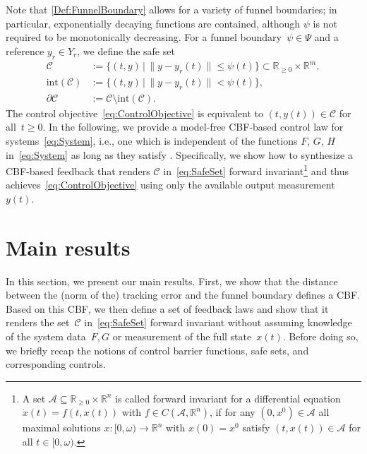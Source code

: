 \documentclass[journal,twoside,web]{ieeeconf}
\newcommand{\R}{\mathbb{R}}
\begin{document}
Note that \eqref{Def:FunnelBoundary} allows for a variety of funnel boundaries; in particular, exponentially decaying functions are contained, although $\psi$ is not required to be monotonically decreasing.
For a funnel boundary~$\psi \in \Psi$ and a reference $y_r \in Y_r$, we define the safe set
\begin{equation} \label{eq:SafeSet}
    \begin{aligned}
        \mathcal{C} &:= \{ (t,y) \, | \,  \| y - y_r(t) \| \le \psi(t)  \} \subset \R_{\ge 0} \times \R^m, \\
        \mathrm{int} (\mathcal{C}) &:= \{ (t,y) \, | \, \| y - y_r(t) \| < \psi(t) \}, \\
        \partial\mathcal{C} &:= \mathcal{C} \setminus \mathrm{int} (\mathcal{C}).
    \end{aligned}
\end{equation}
The control objective~\eqref{eq:ControlObjective} is equivalent to $(t,y(t)) \in \mathcal{C}$ for all~$t \ge 0$. 
In the following, we provide a model-free CBF-based control law for systems~\eqref{eq:System}, i.e., one which is independent of the functions $F$, $G$, $H$ in~\eqref{eq:System} as long as they satisfy . Specifically, we show how to synthesize a CBF-based feedback that renders $\mathcal{C}$ in~\eqref{eq:SafeSet} forward invariant\footnote{A set $\mathcal{A}\subseteq\R_{\ge 0}\times \R^n$ is called forward invariant for a differential equation $\dot x(t) = f(t,x(t))$ with $f\in C(\mathcal{A},\R^n)$, if for any $(0,x^0)\in\mathcal{A}$ all maximal solutions $x:[0,\omega)\to\R^n$ with $x(0)=x^0$ satisfy $(t,x(t))\in \mathcal{A}$ for all $t\in[0,\omega)$.} and thus achieves~\eqref{eq:ControlObjective} using only the available output measurement $y(t)$.

\section{Main results} \label{Sec:MainResults}
In this section, we present our main results.
First, we show that the distance between the (norm of the) tracking error and the funnel boundary defines a CBF. 
Based on this CBF, we then define a set of feedback laws and show that it renders the set~$\mathcal{C}$ in~\eqref{eq:SafeSet} forward invariant without assuming knowledge of the system data~$F,G$ or measurement of the full state~$x(t)$.
Before doing so, we briefly recap the notions of control barrier functions, safe sets, and corresponding controls.
\end{document}
